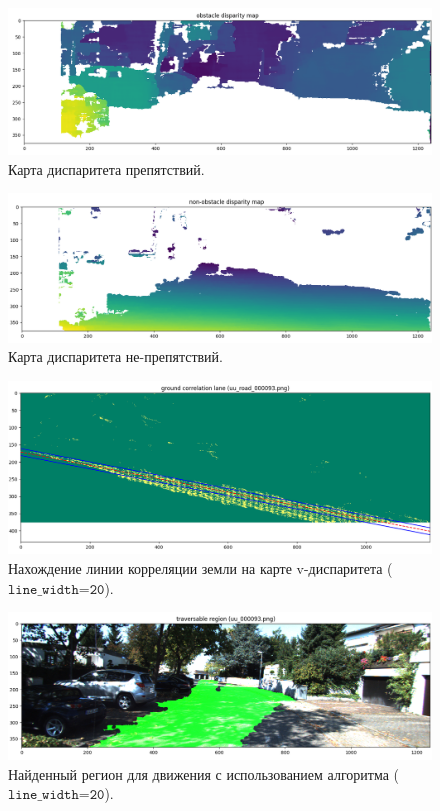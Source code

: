 \documentclass[oneside,final,12pt]{scrartcl}
\begin{document}
	\begin{figure}[p]
		\centering
		\includegraphics[width=0.7\linewidth]{obst_disp.png}
		\caption{Карта диспаритета препятствий.}
		\label{fig:obst_disp}
	\end{figure}

	\begin{figure}[p]
		\centering
		\includegraphics[width=0.7\linewidth]{non_obst_disp.png}
		\caption{Карта диспаритета не-препятствий.}
		\label{fig:non_obst_disp}
	\end{figure}

	\begin{figure}[p]
		\centering
		\includegraphics[width=0.7\linewidth]{gr_corelation.png}
		\caption{Нахождение линии корреляции земли на карте v-диспаритета (\(\texttt{line\_width=20}\)).}
		\label{fig:gr_corelation}
	\end{figure}

	\begin{figure}[p]
		\centering
		\includegraphics[width=0.7\linewidth]{img_with_tr_reg.png}
		\caption{Найденный регион для движения с использованием алгоритма (\(\texttt{line\_width=20}\)).}
		\label{fig:img_with_tr_reg}
	\end{figure}
\end{document}
